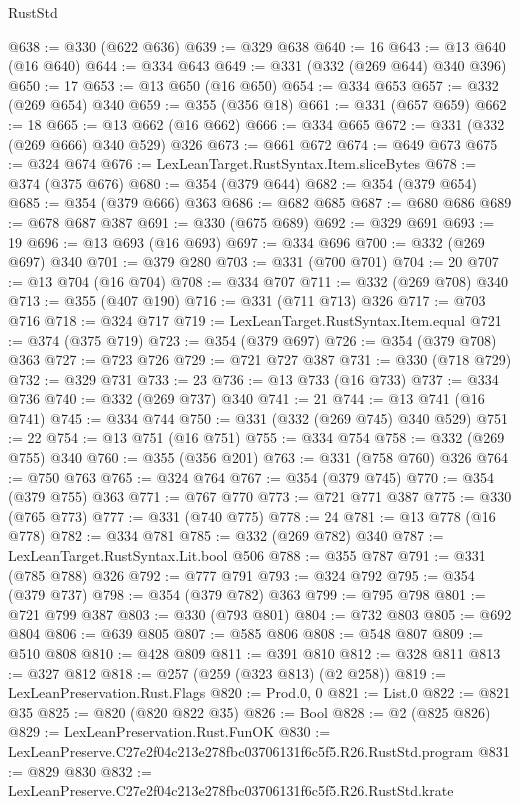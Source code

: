 \begin{lexlean}{RustStd}
\begin{coremodule}
@638 := @330 (@622 @636)
@639 := @329 @638
@640 := 16
@643 := @13 @640 (@16 @640)
@644 := @334 @643
@649 := @331 (@332 (@269 @644) @340 @396)
@650 := 17
@653 := @13 @650 (@16 @650)
@654 := @334 @653
@657 := @332 (@269 @654) @340
@659 := @355 (@356 @18)
@661 := @331 (@657 @659)
@662 := 18
@665 := @13 @662 (@16 @662)
@666 := @334 @665
@672 := @331 (@332 (@269 @666) @340 @529) @326
@673 := @661 @672
@674 := @649 @673
@675 := @324 @674
@676 := LexLeanTarget.RustSyntax.Item.sliceBytes
@678 := @374 (@375 @676)
@680 := @354 (@379 @644)
@682 := @354 (@379 @654)
@685 := @354 (@379 @666) @363
@686 := @682 @685
@687 := @680 @686
@689 := @678 @687 @387
@691 := @330 (@675 @689)
@692 := @329 @691
@693 := 19
@696 := @13 @693 (@16 @693)
@697 := @334 @696
@700 := @332 (@269 @697) @340
@701 := @379 @280
@703 := @331 (@700 @701)
@704 := 20
@707 := @13 @704 (@16 @704)
@708 := @334 @707
@711 := @332 (@269 @708) @340
@713 := @355 (@407 @190)
@716 := @331 (@711 @713) @326
@717 := @703 @716
@718 := @324 @717
@719 := LexLeanTarget.RustSyntax.Item.equal
@721 := @374 (@375 @719)
@723 := @354 (@379 @697)
@726 := @354 (@379 @708) @363
@727 := @723 @726
@729 := @721 @727 @387
@731 := @330 (@718 @729)
@732 := @329 @731
@733 := 23
@736 := @13 @733 (@16 @733)
@737 := @334 @736
@740 := @332 (@269 @737) @340
@741 := 21
@744 := @13 @741 (@16 @741)
@745 := @334 @744
@750 := @331 (@332 (@269 @745) @340 @529)
@751 := 22
@754 := @13 @751 (@16 @751)
@755 := @334 @754
@758 := @332 (@269 @755) @340
@760 := @355 (@356 @201)
@763 := @331 (@758 @760) @326
@764 := @750 @763
@765 := @324 @764
@767 := @354 (@379 @745)
@770 := @354 (@379 @755) @363
@771 := @767 @770
@773 := @721 @771 @387
@775 := @330 (@765 @773)
@777 := @331 (@740 @775)
@778 := 24
@781 := @13 @778 (@16 @778)
@782 := @334 @781
@785 := @332 (@269 @782) @340
@787 := LexLeanTarget.RustSyntax.Lit.bool @506
@788 := @355 @787
@791 := @331 (@785 @788) @326
@792 := @777 @791
@793 := @324 @792
@795 := @354 (@379 @737)
@798 := @354 (@379 @782) @363
@799 := @795 @798
@801 := @721 @799 @387
@803 := @330 (@793 @801)
@804 := @732 @803
@805 := @692 @804
@806 := @639 @805
@807 := @585 @806
@808 := @548 @807
@809 := @510 @808
@810 := @428 @809
@811 := @391 @810
@812 := @328 @811
@813 := @327 @812
@818 := @257 (@259 (@323 @813) (@2 @258))
@819 := LexLeanPreservation.Rust.Flags
@820 := Prod.{0, 0}
@821 := List.{0}
@822 := @821 @35
@825 := @820 (@820 @822 @35)
@826 := Bool
@828 := @2 (@825 @826)
@829 := LexLeanPreservation.Rust.FunOK
@830 := LexLeanPreserve.C27e2f04c213e278fbc03706131f6c5f5.R26.RustStd.program
@831 := @829 @830
@832 := LexLeanPreserve.C27e2f04c213e278fbc03706131f6c5f5.R26.RustStd.krate

\end{coremodule}
\end{lexlean}
